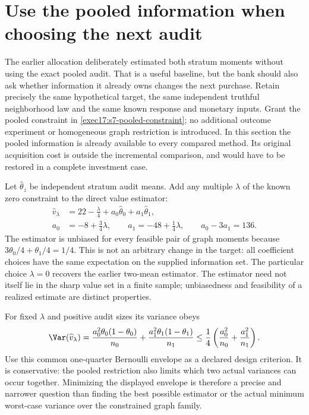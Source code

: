 \section{Use the pooled information when choosing the next audit}
\label{exec17:s7-constraint-design}

The earlier allocation deliberately estimated both stratum moments without
using the exact pooled audit. That is a useful baseline, but the bank should
also ask whether information it already owns changes the next purchase.
Retain precisely the same hypothetical target, the same independent truthful
neighborhood law and the same known response and monetary inputs. Grant the
pooled constraint in \eqref{exec17:s7-pooled-constraint}; no additional outcome
experiment or homogeneous graph restriction is introduced. In this section
the pooled information is already available to every compared method. Its
original acquisition cost is outside the incremental comparison, and would
have to be restored in a complete investment case.

Let $\widehat\theta_z$ be independent stratum audit means. Add any multiple
$\lambda$ of the known zero constraint to the direct value estimator:
\begin{equation}
 \begin{split}
  \widehat v_\lambda
   &=22-\tfrac\lambda4+a_0\widehat\theta_0+a_1\widehat\theta_1,\\
  a_0&=-8+\tfrac34\lambda,\qquad
  a_1=-48+\tfrac14\lambda,\qquad a_0-3a_1=136.
 \end{split}
 \label{exec17:s7-constrained-estimator}
\end{equation}
The estimator is unbiased for every feasible pair of graph moments because
$3\theta_0/4+\theta_1/4=1/4$. This is not an arbitrary change in the target:
all coefficient choices have the same expectation on the supplied information
set. The particular choice $\lambda=0$ recovers the earlier two-mean estimator.
The estimator need not itself lie in the sharp value set in a finite sample;
unbiasedness and feasibility of a realized estimate are distinct properties.

For fixed $\lambda$ and positive audit sizes its variance obeys
\begin{equation}
 \Var(\widehat v_\lambda)
 =\frac{a_0^2\theta_0(1-\theta_0)}{n_0}
  +\frac{a_1^2\theta_1(1-\theta_1)}{n_1}
 \leq \frac14\left(\frac{a_0^2}{n_0}+\frac{a_1^2}{n_1}\right).
 \label{exec17:s7-constrained-variance}
\end{equation}
Use this common one-quarter Bernoulli envelope as a declared design criterion.
It is conservative: the pooled restriction also limits which two actual
variances can occur together. Minimizing the displayed envelope is therefore
a precise and narrower question than finding the best possible estimator or
the actual minimum worst-case variance over the constrained graph family.

